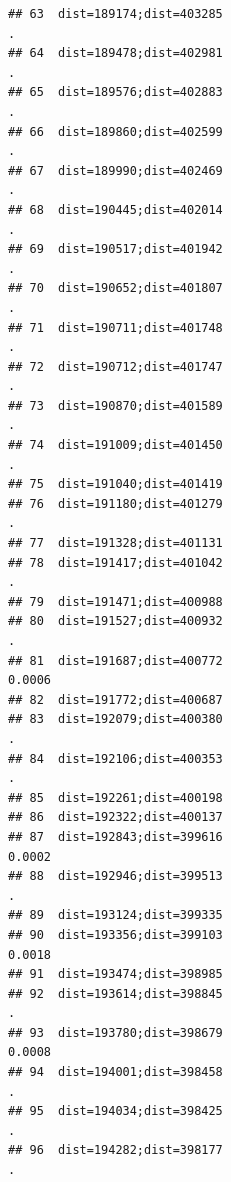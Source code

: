 \documentclass[
]{article}
\begin{document}
\begin{verbatim}
## 63  dist=189174;dist=403285                                              .
## 64  dist=189478;dist=402981                                              .
## 65  dist=189576;dist=402883                                              .
## 66  dist=189860;dist=402599                                              .
## 67  dist=189990;dist=402469                                              .
## 68  dist=190445;dist=402014                                              .
## 69  dist=190517;dist=401942                                              .
## 70  dist=190652;dist=401807                                              .
## 71  dist=190711;dist=401748                                              .
## 72  dist=190712;dist=401747                                              .
## 73  dist=190870;dist=401589                                              .
## 74  dist=191009;dist=401450                                              .
## 75  dist=191040;dist=401419                                               
## 76  dist=191180;dist=401279                                              .
## 77  dist=191328;dist=401131                                               
## 78  dist=191417;dist=401042                                              .
## 79  dist=191471;dist=400988                                               
## 80  dist=191527;dist=400932                                              .
## 81  dist=191687;dist=400772                                         0.0006
## 82  dist=191772;dist=400687                                               
## 83  dist=192079;dist=400380                                              .
## 84  dist=192106;dist=400353                                              .
## 85  dist=192261;dist=400198                                               
## 86  dist=192322;dist=400137                                               
## 87  dist=192843;dist=399616                                         0.0002
## 88  dist=192946;dist=399513                                              .
## 89  dist=193124;dist=399335                                               
## 90  dist=193356;dist=399103                                         0.0018
## 91  dist=193474;dist=398985                                               
## 92  dist=193614;dist=398845                                              .
## 93  dist=193780;dist=398679                                         0.0008
## 94  dist=194001;dist=398458                                              .
## 95  dist=194034;dist=398425                                              .
## 96  dist=194282;dist=398177                                              .

\end{verbatim}
\end{document}
